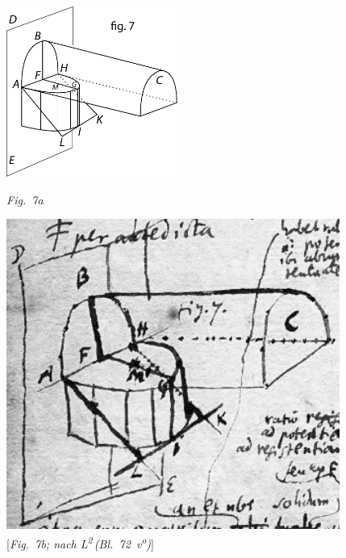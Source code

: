 %
%
  \centerline{%
  \includegraphics[width=0.42\textwidth]{gesamttex/edit_VIII,3/images/dnr-7a_LH_37_03_071-072+AE_1684_319-325_d7a.pdf}}%
  \centerline{
  \lbrack\textit{Fig.~7a}\rbrack}%
  \label{AE_1684_324_Fig.7}%
 \vspace{2.5em}
     \pstart%
     \begin{minipage}[t]{0.5\textwidth}
  \hspace*{-6mm}
   \includegraphics[width=0.82\textwidth]{gesamttex/edit_VIII,3/images/dnr-7b_LH_37_03_071-072_d7b.pdf}\\
  \newline
   \vspace*{1.0em}
   \hspace*{0mm}[\textit{Fig.~7b; nach L\textsuperscript{2}\,(Bl.~72~v\textsuperscript{o})}]
   \end{minipage}
